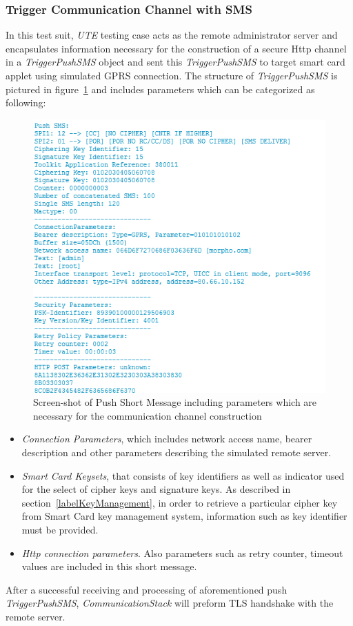 \subsubsection{Trigger Communication Channel with SMS} \label{secAppletTest1}
In this test suit, \emph{UTE} testing case acts as the remote administrator server and encapsulates information necessary for the construction of a secure Http channel in a \emph{TriggerPushSMS} object and sent this \emph{TriggerPushSMS} to target smart card applet using simulated GPRS connection. The structure of \emph{TriggerPushSMS}  is pictured in figure~\ref{fig:push-sms} and includes parameters which can be categorized as following:
\begin{figure}[!htb]
	\centering
	\includegraphics[width=1.0\textwidth]{Images/impl/push-sms.png}
		\caption{Screen-shot of Push Short Message including parameters which are necessary for the communication channel construction}
	\label{fig:push-sms}
\end{figure}
\begin{itemize}
\item \emph{Connection Parameters}, which includes network access name, bearer description and other parameters describing the simulated remote server.
\item \emph{Smart Card Keysets}, that consists of key identifiers as well as indicator used for the select of cipher keys and signature keys. As described in section~\ref{labelKeyManagement}, in order to retrieve a particular cipher key from Smart Card  key management system, information such as key identifier must be provided.
\item \emph{Http connection parameters}. Also parameters such as retry counter, timeout values are included in this short message.
\end{itemize}
After a successful receiving and processing of aforementioned push \emph{TriggerPushSMS}, \emph{CommunicationStack} will preform TLS handshake with the remote server. 

